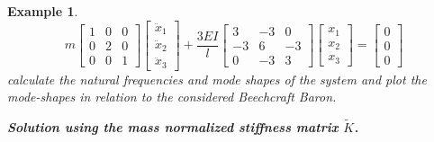 \documentclass[12pt,letter]{article}
\newtheorem{ex}{Example}
\numberwithin{ex}{section} %
\newenvironment{example}{\begin{mdframed}[middlelinewidth=0.5mm]\begin{ex}\normalfont}{\end{ex}\end{mdframed}}
\numberwithin{re}{section} %
\begin{document}
\begin{example}
\begin{equation}
	  m\begin{bmatrix} 1 & 0 & 0 \\    0  & 2 & 0 \\ 0  & 0 & 1 \end{bmatrix} \begin{bmatrix} \ddot{x}_1 \\    \ddot{x}_2 \\    \ddot{x}_3  \end{bmatrix} + \frac{3EI}{l} \begin{bmatrix} 3 & -3 & 0 \\  -3  & 6 & -3 \\  0  & -3 & 3 \end{bmatrix} \begin{bmatrix} x_1 \\    x_2 \\    x_3 \end{bmatrix} = \begin{bmatrix} 0 \\  0 \\ 0 \end{bmatrix} 
\end{equation}
calculate the natural frequencies and mode shapes of the system and plot the mode-shapes in relation to the considered Beechcraft Baron.

\vspace{2ex}
\noindent \textbf{Solution using the mass normalized stiffness matrix $\tilde{K}$.}
\vspace{1ex}


\end{example}
\end{document}
